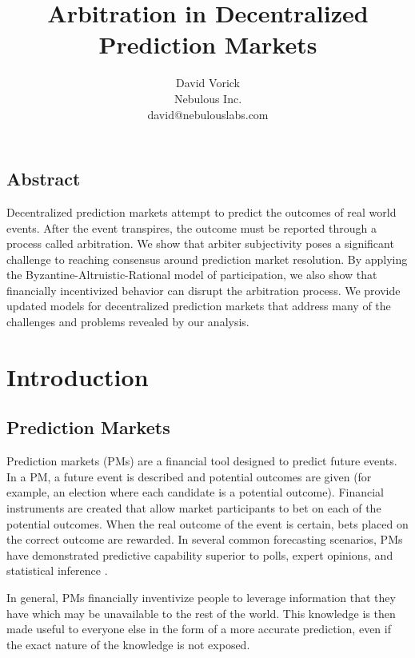 \documentclass[onecolumn]{article}
\begin{document}
\frenchspacing

\title{Arbitration in Decentralized Prediction Markets}

\author{
{\rm David Vorick}\\
Nebulous Inc.\\
david@nebulouslabs.com
}

\maketitle

\subsection*{Abstract}
Decentralized prediction markets attempt to predict the outcomes of real world events.
After the event transpires, the outcome must be reported through a process called arbitration.
We show that arbiter subjectivity poses a significant challenge to reaching consensus around prediction market resolution.
By applying the Byzantine-Altruistic-Rational model of participation, we also show that financially incentivized behavior can disrupt the arbitration process.
We provide updated models for decentralized prediction markets that address many of the challenges and problems revealed by our analysis.

\section{Introduction}

\subsection{Prediction Markets}
Prediction markets (PMs) are a financial tool designed to predict future events.
In a PM, a future event is described and potential outcomes are given (for example, an election where each candidate is a potential outcome).
Financial instruments are created that allow market participants to bet on each of the potential outcomes.
When the real outcome of the event is certain, bets placed on the correct outcome are rewarded.
In several common forecasting scenarios, PMs have demonstrated predictive capability superior to polls, expert opinions, and statistical inference \cite{promise}.

In general, PMs financially inventivize people to leverage information that they have which may be unavailable to the rest of the world.
This knowledge is then made useful to everyone else in the form of a more accurate prediction, even if the exact nature of the knowledge is not exposed.
\end{document}
